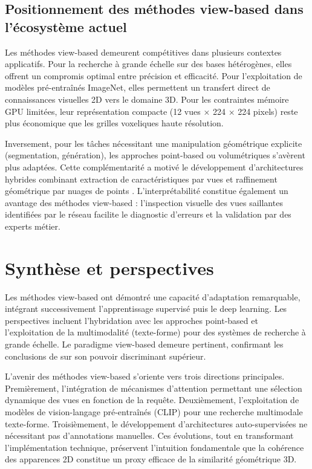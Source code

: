 \documentclass[11pt,a4paper,oneside]{report}
\begin{document}
\subsection{Positionnement des méthodes view-based dans l'écosystème actuel}

Les méthodes view-based demeurent compétitives dans plusieurs contextes applicatifs. Pour la recherche à grande échelle sur des bases hétérogènes, elles offrent un compromis optimal entre précision et efficacité. Pour l'exploitation de modèles pré-entraînés ImageNet, elles permettent un transfert direct de connaissances visuelles 2D vers le domaine 3D. Pour les contraintes mémoire GPU limitées, leur représentation compacte (12 vues × 224 × 224 pixels) reste plus économique que les grilles voxeliques haute résolution.

Inversement, pour les tâches nécessitant une manipulation géométrique explicite (segmentation, génération), les approches point-based ou volumétriques s'avèrent plus adaptées. Cette complémentarité a motivé le développement d'architectures hybrides combinant extraction de caractéristiques par vues et raffinement géométrique par nuages de points \cite{you2018pvnet}. L'interprétabilité constitue également un avantage des méthodes view-based : l'inspection visuelle des vues saillantes identifiées par le réseau facilite le diagnostic d'erreurs et la validation par des experts métier.

\section{Synthèse et perspectives}

Les méthodes view-based ont démontré une capacité d'adaptation remarquable, intégrant successivement l'apprentissage supervisé puis le deep learning. Les perspectives incluent l'hybridation avec les approches point-based \cite{you2018pvnet} et l'exploitation de la multimodalité (texte-forme) pour des systèmes de recherche à grande échelle. Le paradigme view-based demeure pertinent, confirmant les conclusions de \cite{tangelder2007survey} sur son pouvoir discriminant supérieur.

L'avenir des méthodes view-based s'oriente vers trois directions principales. Premièrement, l'intégration de mécanismes d'attention permettant une sélection dynamique des vues en fonction de la requête. Deuxièmement, l'exploitation de modèles de vision-langage pré-entraînés (CLIP) pour une recherche multimodale texte-forme. Troisièmement, le développement d'architectures auto-supervisées ne nécessitant pas d'annotations manuelles. Ces évolutions, tout en transformant l'implémentation technique, préservent l'intuition fondamentale que la cohérence des apparences 2D constitue un proxy efficace de la similarité géométrique 3D.
\end{document}
